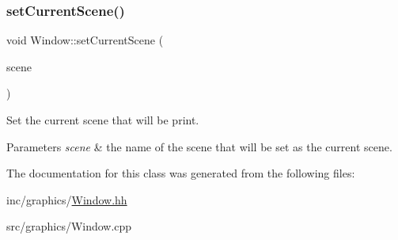 \subsubsection{\texorpdfstring{set\+Current\+Scene()}{setCurrentScene()}}
{\footnotesize\ttfamily void Window\+::set\+Current\+Scene (\begin{DoxyParamCaption}\item[{const std\+::shared\+\_\+ptr$<$ \hyperlink{classAScene}{A\+Scene} $>$ \&}]{scene }\end{DoxyParamCaption})}



Set the current scene that will be print. 


\begin{DoxyParams}{Parameters}
{\em scene} & the name of the scene that will be set as the current scene. \\
\hline
\end{DoxyParams}


The documentation for this class was generated from the following files\+:\begin{DoxyCompactItemize}
\item 
inc/graphics/\hyperlink{Window_8hh}{Window.\+hh}\item 
src/graphics/Window.\+cpp\end{DoxyCompactItemize}
